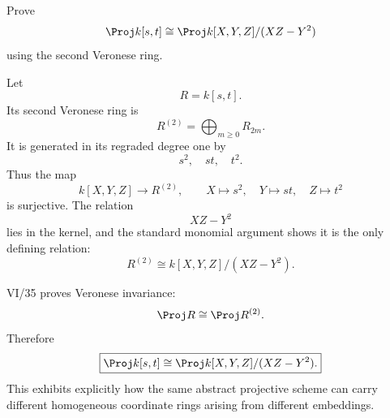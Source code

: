 \begin{problem}\label{prob:vi37-16}
Prove
\[
\Proj k[s,t]
\cong
\Proj k[X,Y,Z]/(XZ-Y^2)
\]
using the second Veronese ring.

\end{problem}

\ifdefined\FullProblemDossiers
\begin{solution}
Let
\[
R=k[s,t].
\]
Its second Veronese ring is
\[
R^{(2)}
=
\bigoplus_{m\ge0}R_{2m}.
\]
It is generated in its regraded degree one by
\[
s^2,\quad st,\quad t^2.
\]
Thus the map
\[
k[X,Y,Z]\longrightarrow R^{(2)},
\qquad
X\mapsto s^2,\quad Y\mapsto st,\quad Z\mapsto t^2
\]
is surjective. The relation
\[
XZ-Y^2
\]
lies in the kernel, and the standard monomial argument shows it is the only defining relation:
\[
R^{(2)}
\cong
k[X,Y,Z]/(XZ-Y^2).
\]

VI/35 proves Veronese invariance:
\[
\Proj R\cong\Proj R^{(2)}.
\]
Therefore
\[
\boxed{
\Proj k[s,t]
\cong
\Proj k[X,Y,Z]/(XZ-Y^2).
}
\]
This exhibits explicitly how the same abstract projective scheme can carry different homogeneous coordinate rings arising from different embeddings.
\end{solution}
\fi
